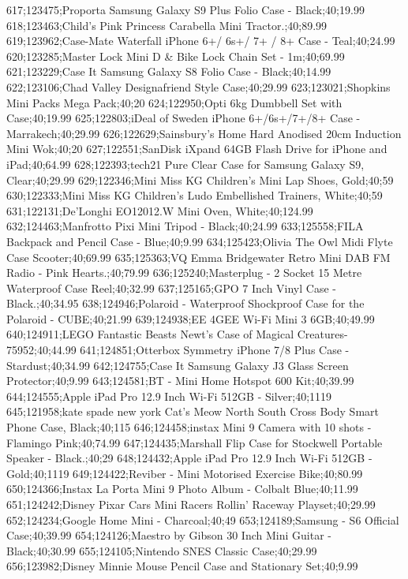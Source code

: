 617;123475;Proporta Samsung Galaxy S9 Plus Folio Case - Black;40;19.99
618;123463;Child's Pink Princess Carabella Mini Tractor.;40;89.99
619;123962;Case-Mate Waterfall iPhone 6+/ 6s+/ 7+ / 8+ Case - Teal;40;24.99
620;123285;Master Lock Mini D & Bike Lock Chain Set - 1m;40;69.99
621;123229;Case It Samsung Galaxy S8 Folio Case - Black;40;14.99
622;123106;Chad Valley Designafriend Style Case;40;29.99
623;123021;Shopkins Mini Packs Mega Pack;40;20
624;122950;Opti 6kg Dumbbell Set with Case;40;19.99
625;122803;iDeal of Sweden iPhone 6+/6s+/7+/8+ Case - Marrakech;40;29.99
626;122629;Sainsbury's Home Hard Anodised 20cm Induction Mini Wok;40;20
627;122551;SanDisk iXpand 64GB Flash Drive for iPhone and iPad;40;64.99
628;122393;tech21 Pure Clear Case for Samsung Galaxy S9, Clear;40;29.99
629;122346;Mini Miss KG Children's Mini Lap Shoes, Gold;40;59
630;122333;Mini Miss KG Children's Ludo Embellished Trainers, White;40;59
631;122131;De'Longhi EO12012.W Mini Oven, White;40;124.99
632;124463;Manfrotto Pixi Mini Tripod - Black;40;24.99
633;125558;FILA Backpack and Pencil Case - Blue;40;9.99
634;125423;Olivia The Owl Midi Flyte Case Scooter;40;69.99
635;125363;VQ Emma Bridgewater Retro Mini DAB FM Radio - Pink Hearts.;40;79.99
636;125240;Masterplug - 2 Socket 15 Metre Waterproof Case Reel;40;32.99
637;125165;GPO 7 Inch Vinyl Case - Black.;40;34.95
638;124946;Polaroid - Waterproof Shockproof Case for the Polaroid - CUBE;40;21.99
639;124938;EE 4GEE Wi-Fi Mini 3 6GB;40;49.99
640;124911;LEGO Fantastic Beasts Newt's Case of Magical Creatures-75952;40;44.99
641;124851;Otterbox Symmetry iPhone 7/8 Plus Case - Stardust;40;34.99
642;124755;Case It Samsung Galaxy J3 Glass Screen Protector;40;9.99
643;124581;BT - Mini Home Hotspot 600 Kit;40;39.99
644;124555;Apple iPad Pro 12.9 Inch Wi-Fi 512GB - Silver;40;1119
645;121958;kate spade new york Cat's Meow North South Cross Body Smart Phone Case, Black;40;115
646;124458;instax Mini 9 Camera with 10 shots - Flamingo Pink;40;74.99
647;124435;Marshall Flip Case for Stockwell Portable Speaker - Black.;40;29
648;124432;Apple iPad Pro 12.9 Inch Wi-Fi 512GB - Gold;40;1119
649;124422;Reviber - Mini Motorised Exercise Bike;40;80.99
650;124366;Instax La Porta Mini 9 Photo Album - Colbalt Blue;40;11.99
651;124242;Disney Pixar Cars Mini Racers Rollin' Raceway Playset;40;29.99
652;124234;Google Home Mini - Charcoal;40;49
653;124189;Samsung - S6 Official Case;40;39.99
654;124126;Maestro by Gibson 30 Inch Mini Guitar - Black;40;30.99
655;124105;Nintendo SNES Classic Case;40;29.99
656;123982;Disney Minnie Mouse Pencil Case and Stationary Set;40;9.99
